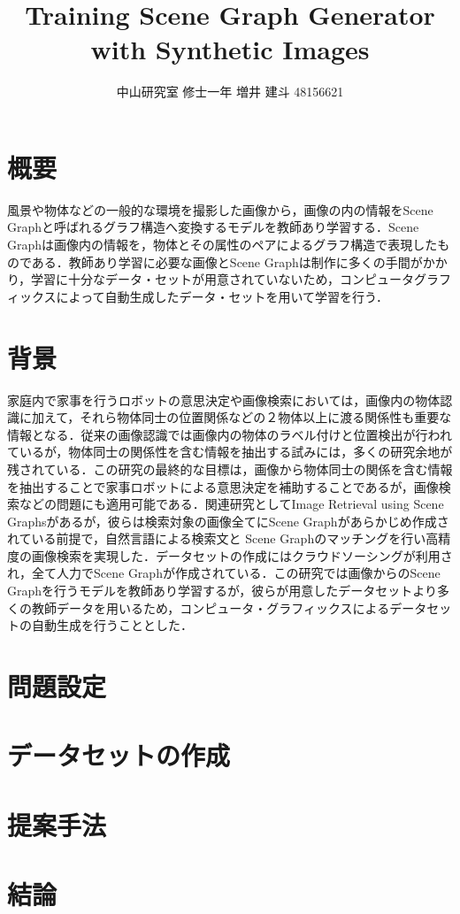

\title{Training Scene Graph Generator with Synthetic Images}
\author{中山研究室 修士一年 増井 建斗 48156621}

\maketitle


\section{概要}
風景や物体などの一般的な環境を撮影した画像から，画像の内の情報をScene Graph\cite{scene_graph}と呼ばれるグラフ構造へ変換するモデルを教師あり学習する．Scene Graphは画像内の情報を，物体とその属性のペアによるグラフ構造で表現したものである．教師あり学習に必要な画像とScene Graphは制作に多くの手間がかかり，学習に十分なデータ・セットが用意されていないため，コンピュータグラフィックスによって自動生成したデータ・セットを用いて学習を行う．
\section{背景}
家庭内で家事を行うロボットの意思決定や画像検索においては，画像内の物体認識に加えて，それら物体同士の位置関係などの２物体以上に渡る関係性も重要な情報となる．従来の画像認識では画像内の物体のラベル付けと位置検出が行われているが，物体同士の関係性を含む情報を抽出する試みには，多くの研究余地が残されている．この研究の最終的な目標は，画像から物体同士の関係を含む情報を抽出することで家事ロボットによる意思決定を補助することであるが，画像検索などの問題にも適用可能である．関連研究としてImage Retrieval using Scene Graphs\cite{scene_graph}があるが，彼らは検索対象の画像全てにScene Graphがあらかじめ作成されている前提で，自然言語による検索文と
Scene Graphのマッチングを行い高精度の画像検索を実現した．データセットの作成にはクラウドソーシングが利用され，全て人力でScene Graphが作成されている．この研究では画像からのScene Graphを行うモデルを教師あり学習するが，彼らが用意したデータセットより多くの教師データを用いるため，コンピュータ・グラフィックスによるデータセットの自動生成を行うこととした．
\section{問題設定}
\section{データセットの作成}
\section{提案手法}
\section{結論}




